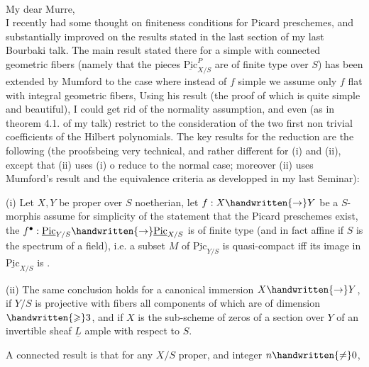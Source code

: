 \\

My dear Murre,\\

I recently had some thought on finiteness conditions for Picard preschemes, and substantially improved on the results stated in the last section of my last Bourbaki talk. The main result stated there for a simple  with connected geometric fibers (namely that the pieces $\underline{\mathrm{Pic}}^{P}_{X/S}$ are of finite type over $S$) has been extended by Mumford to the case where  instead of $f$ simple we assume only $f$ flat with integral geometric fibers, Using his result (the proof of which is quite simple and beautiful), I could get rid of the normality assumption, and even (as in theorem 4.1. of my talk) restrict to the consideration of the two first non trivial coefficients of the Hilbert polynomials. The key results for the reduction are the following (the proofsbeing very technical, and rather different for (i) and (ii), except that (ii) uses (i) o reduce to the normal case; moreover (ii) uses Mumford's result and the equivalence criteria as developped in my last Seminar):

(i) Let $X,Y$ be proper over $S$ noetherian, let $f:X\handwritten{\to}Y$ be a  $S$-morphis  assume for simplicity of the statement that the Picard preschemes exist, the $f^{\bullet}:\underline{\mathrm{Pic}}_{Y/S}\handwritten{\to}\underline{\mathrm{Pic}}_{X/S}$ is of finite type (and in fact affine if $S$ is the spectrum of a field), i.e. a subset $M$ of $\underline{\mathrm{Pic}}_{Y/S}$ is quasi-compact iff its image in $\underline{\mathrm{Pic}}_{X/S}$ is .

(ii) The same conclusion holds for a canonical immersion $X\handwritten{\to}Y$, if $Y/S$ is projective with fibers all components of which are of dimension $\handwritten{\geqslant}3$, and if $X$ is the sub-scheme of zeros of a section over $Y$ of an invertible sheaf $\underline{L}$ ample with respect to $S$.

A connected result is that for any $X/S$ proper, and integer $n\handwritten{\ne}0$,
